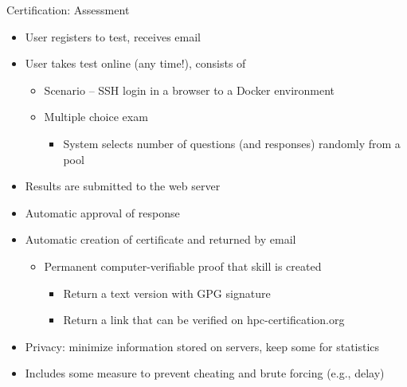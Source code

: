 \documentclass[compress,aspectratio=169]{beamer}
\begin{document}
\begin{frame}{Certification: Assessment}
		\begin{itemize}
      \item[\color{goettingenBlue}{1.}] User registers to test, receives email
			\item[\color{goettingenBlue}{2.}] User takes test online (any time!), consists of
			\begin{itemize}
        \item Scenario -- SSH login in a browser to a Docker environment
        \item Multiple choice exam
        \begin{itemize}
          \item System selects number of questions (and responses) randomly from a pool
        \end{itemize}
			\end{itemize}
			\item[\color{goettingenBlue}{3.}] Results are submitted to the web server
			\item[\color{goettingenBlue}{4.}] Automatic approval of response
			\item[\color{goettingenBlue}{5.}] Automatic creation of certificate and returned by email
			\begin{itemize}
							\item Permanent computer-verifiable proof that skill is created
							\begin{itemize}
								\item Return a text version with GPG signature
								\item Return a link that can be verified on hpc-certification.org
							\end{itemize}
			\end{itemize}
			\item Privacy: minimize information stored on servers, keep some for statistics
			\item Includes some measure to prevent cheating and brute forcing (e.g., delay)
		\end{itemize}
\end{frame}
\end{document}
